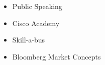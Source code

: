 \begin{minipage}[t]{0.33\textwidth}
{\begin{minipage}[t][293mm][t]{0.82\textwidth}
	

	\begin{itemize}
		\item Public Speaking
		\item Cisco Academy
		\item Skill-a-bus
		\item Bloomberg Market Concepts
	\end{itemize}

	\end{minipage}%
	\textwidth\relax
} 									%
\end{minipage} 						%